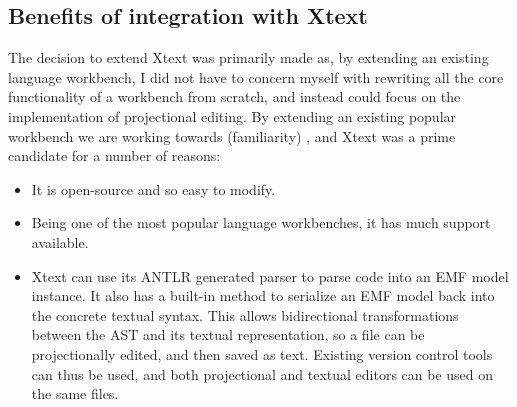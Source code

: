 \documentclass{article}
\begin{document}
\subsection{Benefits of integration with Xtext}\label{integrationWithXtext}
The decision to extend Xtext was primarily made as, by extending an existing language workbench, I did not have to concern myself with rewriting all the core functionality of a workbench from scratch, and instead could focus on the implementation of projectional editing. By extending an existing popular workbench we are working towards \RFamiliarity (familiarity) , and Xtext was a prime candidate for a number of reasons:
\begin{itemize}
\item It is open-source and so easy to modify.
\item Being one of the most popular language workbenches, it has much support available.
\item Xtext can use its ANTLR generated parser to parse code into an EMF model instance. It also has a built-in method to serialize an EMF model back into the concrete textual syntax. This allows bidirectional transformations between the AST and its textual representation, so a file can be projectionally edited, and then saved as text. Existing version control tools can thus be used, and both projectional and textual editors can be used on the same files.
\end{itemize}
\end{document}
